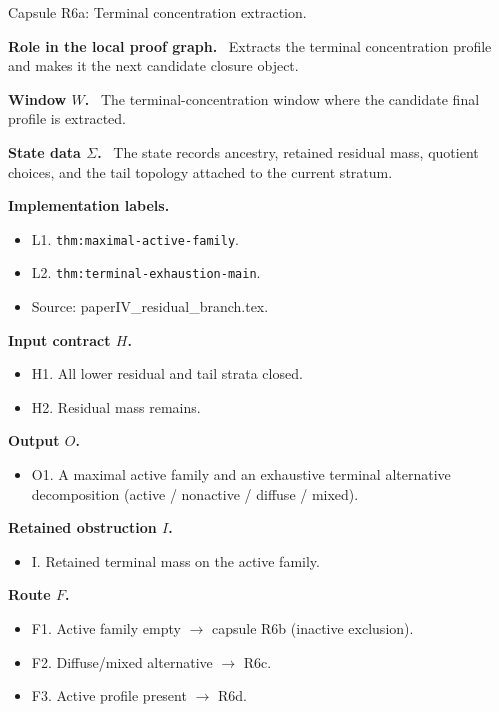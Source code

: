 \documentclass[11pt]{amsart}
\newcommand{\capsulefield}[1]{\par\smallskip\noindent\textbf{#1.}\ }
\begin{document}
\begin{proofcapsule}{Capsule R6a: Terminal concentration extraction.}
  \capsulefield{Role in the local proof graph}
  Extracts the terminal concentration profile and makes it the next candidate closure object.

  \capsulefield{Window \(W\)}
The terminal-concentration window where the candidate final profile is extracted.

  \capsulefield{State data \(\Sigma\)}
The state records ancestry, retained residual mass, quotient choices, and the tail topology attached to the current stratum.

  \capsulefield{Implementation labels}
  \begin{itemize}[leftmargin=1.8em]
  \item L1. \texttt{thm:maximal-active-family}.
  \item L2. \texttt{thm:terminal-exhaustion-main}.
  \item Source: paperIV\_residual\_branch.tex.
  \end{itemize}

  \capsulefield{Input contract \(H\)}
  \begin{itemize}[leftmargin=1.8em]
  \item H1. All lower residual and tail strata closed.
  \item H2. Residual mass remains.
  \end{itemize}

  \capsulefield{Output \(O\)}
  \begin{itemize}[leftmargin=1.8em]
  \item O1. A maximal active family and an exhaustive terminal alternative decomposition (active / nonactive / diffuse / mixed).
  \end{itemize}

  \capsulefield{Retained obstruction \(I\)}
  \begin{itemize}[leftmargin=1.8em]
  \item I. Retained terminal mass on the active family.
  \end{itemize}

  \capsulefield{Route \(F\)}
  \begin{itemize}[leftmargin=1.8em]
  \item F1. Active family empty $\to$ capsule R6b (inactive exclusion).
  \item F2. Diffuse/mixed alternative $\to$ R6c.
  \item F3. Active profile present $\to$ R6d.
  \end{itemize}


\end{proofcapsule}
\end{document}
